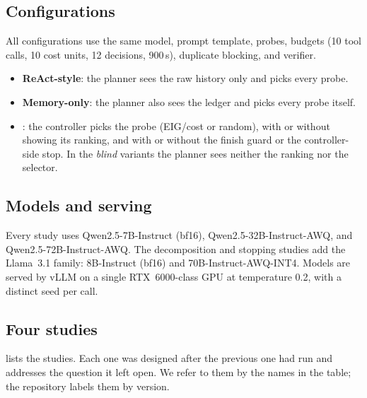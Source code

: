 \subsection{Configurations}
All configurations use the same model, prompt template, probes, budgets (10 tool calls, 10 cost units, 12 decisions, 900\,s), duplicate blocking, and verifier.
\begin{itemize}
  \item \textbf{ReAct-style}: the planner sees the raw history only and picks every probe.
  \item \textbf{Memory-only}: the planner also sees the ledger and picks every probe itself.
  \item \textbf{\hesp{}}: the controller picks the probe (EIG/cost or random), with or without showing its ranking, and with or without the finish guard or the controller-side stop. In the \emph{blind} variants the planner sees neither the ranking nor the selector.
\end{itemize}

\subsection{Models and serving}
Every study uses Qwen2.5-7B-Instruct (bf16), Qwen2.5-32B-Instruct-AWQ, and Qwen2.5-72B-Instruct-AWQ. The decomposition and stopping studies add the Llama~3.1 family: 8B-Instruct (bf16) and 70B-Instruct-AWQ-INT4. Models are served by vLLM on a single RTX~6000-class GPU at temperature 0.2, with a distinct seed per call.

\subsection{Four studies}
 lists the studies. Each one was designed after the previous one had run and addresses the question it left open. We refer to them by the names in the table; the repository labels them by version.

